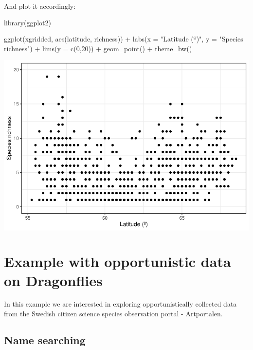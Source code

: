 \documentclass[
  10pt,
]{article}
\newenvironment{Shaded}{\begin{snugshade}}{\end{snugshade}}
\newcommand{\AttributeTok}[1]{\textcolor[rgb]{0.77,0.63,0.00}{#1}}
\newcommand{\DecValTok}[1]{\textcolor[rgb]{0.00,0.00,0.81}{#1}}
\newcommand{\FunctionTok}[1]{\textcolor[rgb]{0.00,0.00,0.00}{#1}}
\newcommand{\NormalTok}[1]{#1}
\newcommand{\SpecialCharTok}[1]{\textcolor[rgb]{0.00,0.00,0.00}{#1}}
\newcommand{\StringTok}[1]{\textcolor[rgb]{0.31,0.60,0.02}{#1}}
\begin{document}
And plot it accordingly:

\begin{Shaded}
\begin{Highlighting}[]
\FunctionTok{library}\NormalTok{(ggplot2)}

\FunctionTok{ggplot}\NormalTok{(xgridded, }\FunctionTok{aes}\NormalTok{(latitude, richness)) }\SpecialCharTok{+} 
  \FunctionTok{labs}\NormalTok{(}\AttributeTok{x =} \StringTok{"Latitude (º)"}\NormalTok{, }
       \AttributeTok{y =} \StringTok{"Species richness"}\NormalTok{) }\SpecialCharTok{+}
  \FunctionTok{lims}\NormalTok{(}\AttributeTok{y =} \FunctionTok{c}\NormalTok{(}\DecValTok{0}\NormalTok{,}\DecValTok{20}\NormalTok{)) }\SpecialCharTok{+}
  \FunctionTok{geom\_point}\NormalTok{() }\SpecialCharTok{+} 
  \FunctionTok{theme\_bw}\NormalTok{()}
\end{Highlighting}
\end{Shaded}

\includegraphics{r-tools-tutorial_files/figure-latex/plot_richLat-1.pdf}

\hypertarget{example-with-opportunistic-data-on-dragonflies}{%
\section{Example with opportunistic data on Dragonflies}\label{example-with-opportunistic-data-on-dragonflies}}

In this example we are interested in exploring opportunistically collected data
from the Swedish citizen science species observation portal - Artportalen.

\hypertarget{name-searching}{%
\subsection{Name searching}\label{name-searching}}
\end{document}
